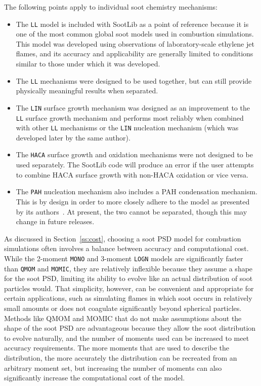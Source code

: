 \documentclass[preprint,letterpaper]{elsarticle}
\begin{document}
The following points apply to individual soot chemistry mechanisms:
\begin{itemize}
    \item The \texttt{LL} model is included with SootLib as a point of reference because it is one of the most common global soot models used in combustion simulations. This model was developed using observations of laboratory-scale ethylene jet flames, and its accuracy and applicability are generally limited to conditions similar to those under which it was developed.
    \item The \texttt{LL} mechanisms were designed to be used together, but can still provide physically meaningful results when separated.
    \item The \texttt{LIN} surface growth mechanism was designed as an improvement to the \texttt{LL} surface growth mechanism and performs most reliably when combined with other \texttt{LL} mechanisms or the \texttt{LIN} nucleation mechanism (which was developed later by the same author).
    \item The \texttt{HACA} surface growth and oxidation mechanisms were not designed to be used separately. The SootLib code will produce an error if the user attempts to combine HACA surface growth with non-HACA oxidation or vice versa.
    \item The \texttt{PAH} nucleation mechanism also includes a PAH condensation mechanism. This is by design in order to more closely adhere to the model as presented by its authors~\cite{Blanquart_2009c}. At present, the two cannot be separated, though this may change in future releases.
\end{itemize}

As discussed in Section~\ref{ss:cost}, choosing a soot PSD model for combustion simulations often involves a balance between accuracy and computational cost. While the 2-moment \texttt{MONO} and 3-moment \texttt{LOGN} models are significantly faster than \texttt{QMOM} and \texttt{MOMIC}, they are relatively inflexible because they assume a shape for the soot PSD, limiting its ability to evolve like an actual distribution of soot particles would. That simplicity, however, can be convenient and appropriate for certain applications, such as simulating flames in which soot occurs in relatively small amounts or does not coagulate significantly beyond spherical particles. Methods like QMOM and MOMIC that do not make assumptions about the shape of the soot PSD are advantageous because they allow the soot distribution to evolve naturally, and the number of moments used can be increased to meet accuracy requirements. The more moments that are used to describe the distribution, the more accurately the distribution can be recreated from an arbitrary moment set, but increasing the number of moments can also significantly increase the computational cost of the model.
\end{document}
